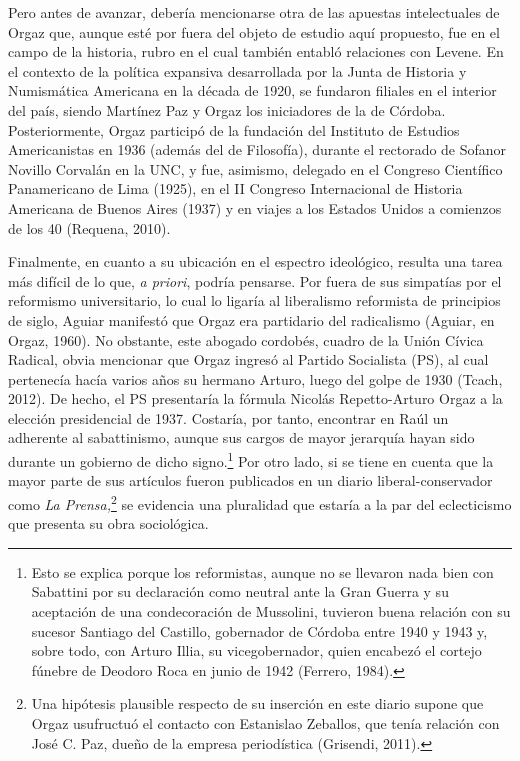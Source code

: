 Pero antes de avanzar, debería mencionarse otra de las apuestas intelectuales de Orgaz que, aunque esté por fuera del objeto de estudio aquí propuesto, fue en el campo de la historia, rubro en el cual también entabló relaciones con Levene. En el contexto de la política expansiva desarrollada por la Junta de Historia y Numismática Americana en la década de 1920, se fundaron filiales en el interior del país, siendo Martínez Paz y Orgaz los iniciadores de la de Córdoba. Posteriormente, Orgaz participó de la fundación del Instituto de Estudios Americanistas en 1936 (además del de Filosofía), durante el rectorado de Sofanor Novillo Corvalán en la UNC, y fue, asimismo, delegado en el Congreso Científico Panamericano de Lima (1925), en el II Congreso Internacional de Historia Americana de Buenos Aires (1937) y en viajes a los Estados Unidos a comienzos de los 40 (Requena, 2010).

Finalmente, en cuanto a su ubicación en el espectro ideológico, resulta una tarea más difícil de lo que, \emph{a priori}, podría pensarse. Por fuera de sus simpatías por el reformismo universitario, lo cual lo ligaría al liberalismo reformista de principios de siglo, Aguiar manifestó que Orgaz era partidario del radicalismo (Aguiar, en Orgaz, 1960). No obstante, este abogado cordobés, cuadro de la Unión Cívica Radical, obvia mencionar que Orgaz ingresó al Partido Socialista (PS), al cual pertenecía hacía varios años su hermano Arturo, luego del golpe de 1930 (Tcach, 2012). De hecho, el PS presentaría la fórmula Nicolás Repetto-Arturo Orgaz a la elección presidencial de 1937. Costaría, por tanto, encontrar en Raúl un adherente al sabattinismo, aunque sus cargos de mayor jerarquía hayan sido durante un gobierno de dicho signo.\footnote{Esto se explica porque los reformistas, aunque no se llevaron nada bien con Sabattini por su declaración como neutral ante la Gran Guerra y su aceptación de una condecoración de Mussolini, tuvieron buena relación con su sucesor Santiago del Castillo, gobernador de Córdoba entre 1940 y 1943 y, sobre todo, con Arturo Illia, su vicegobernador, quien encabezó el cortejo fúnebre de Deodoro Roca en junio de 1942 (Ferrero, 1984).} Por otro lado, si se tiene en cuenta que la mayor parte de sus artículos fueron publicados en un diario liberal-conservador como \emph{La Prensa,}\footnote{Una hipótesis plausible respecto de su inserción en este diario supone que Orgaz usufructuó el contacto con Estanislao Zeballos, que tenía relación con José C. Paz, dueño de la empresa periodística (Grisendi, 2011).} se evidencia una pluralidad que estaría a la par del eclecticismo que presenta su obra sociológica.

